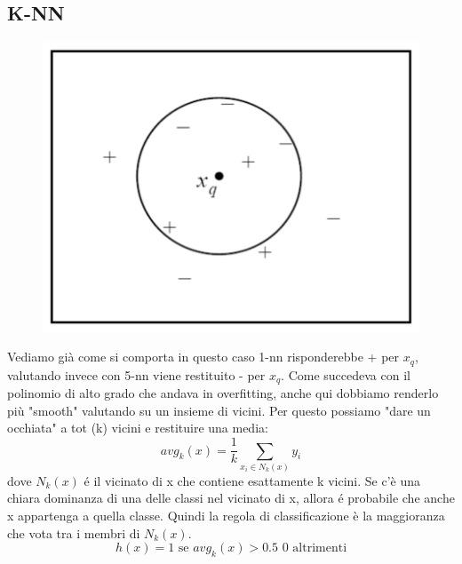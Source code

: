 \documentclass{article}
\begin{document}
\subsection{K-NN}
\begin{figure}[H]
\centering
\includegraphics[scale=0.4]{Images/5-nn.png}
\end{figure}
Vediamo già come si comporta in questo caso 1-nn risponderebbe + per $x_q$, valutando invece con 5-nn viene restituito - per $x_q$. Come succedeva con il polinomio di alto grado che andava in overfitting, anche qui dobbiamo renderlo più "smooth" valutando su un insieme di vicini. \newline
Per questo possiamo "dare un occhiata" a tot (k) vicini e restituire una media: \[avg_k(x)=\frac{1}{k}\sum_{x_i\in N_k(x)} y_i\] dove $N_k(x)$ é il vicinato di x che contiene esattamente k vicini. Se c'è una chiara dominanza di una delle classi nel vicinato di x, allora é probabile che anche x appartenga a quella classe. Quindi la regola di classificazione è la maggioranza che vota tra i membri di $N_k (x)$. \[h(x)=1 \text{ se } avg_k(x)>0.5 \text{      0 altrimenti}\]
\end{document}
